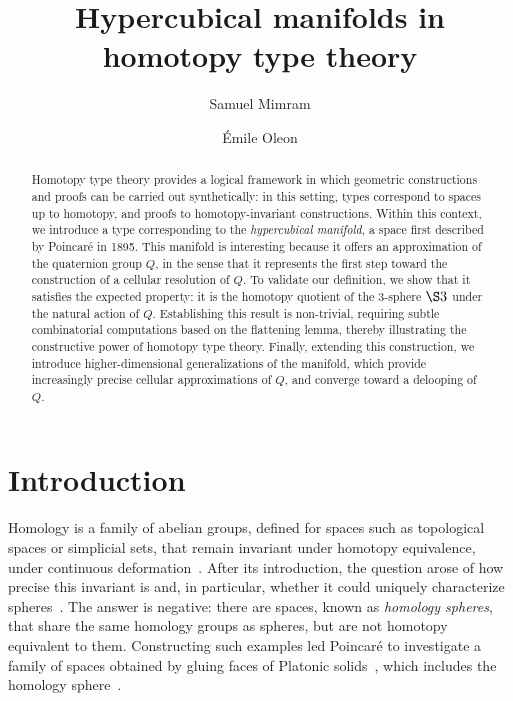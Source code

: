 \documentclass[a4paper]{article}
\title{Hypercubical manifolds in homotopy type theory}
\author[1]{Samuel Mimram}
\author[1]{Émile Oleon}
\affil[1]{LIX, CNRS, École polytechnique, Institut Polytechnique de Paris, Palaiseau, France}
\date{}
\newcommand{\citep}{\cite}
\begin{document}
\maketitle

\begin{abstract}
Homotopy type theory provides a logical framework in which geometric constructions and proofs can be carried out synthetically: in this setting, types correspond to spaces up to homotopy, and proofs to homotopy-invariant constructions. Within this context, we introduce a type corresponding to the \emph{hypercubical manifold}, a space first described by Poincaré in 1895. This manifold is interesting because it offers an approximation of the quaternion group $Q$, in the sense that it represents the first step toward the construction of a cellular resolution of $Q$. To validate our definition, we show that it satisfies the expected property: it is the homotopy quotient of the 3-sphere $\S3$ under the natural action of $Q$. Establishing this result is non-trivial, requiring subtle combinatorial computations based on the flattening lemma, thereby illustrating the constructive power of homotopy type theory. Finally, extending this construction, we introduce higher-dimensional generalizations of the manifold, which provide increasingly precise cellular approximations of $Q$, and converge toward a delooping of $Q$.

\end{abstract}


\section{Introduction}
Homology is a family of abelian groups, defined for spaces such as topological spaces or simplicial sets, that remain invariant under homotopy equivalence, \ie under continuous deformation~\citep{maclane2012homology}. After its introduction, the question arose of how precise this invariant is and, in particular, whether it could uniquely characterize spheres~\citep{poincare1900second}. The answer is negative: there are spaces, known as \emph{homology spheres}, that share the same homology groups as spheres, but are not homotopy equivalent to them.
%
Constructing such examples led Poincaré to investigate a family of spaces obtained by gluing faces of Platonic solids~\citep{poincare1895analysis}, which includes the homology sphere~\citep{poincare1904cinquieme}.
\end{document}
